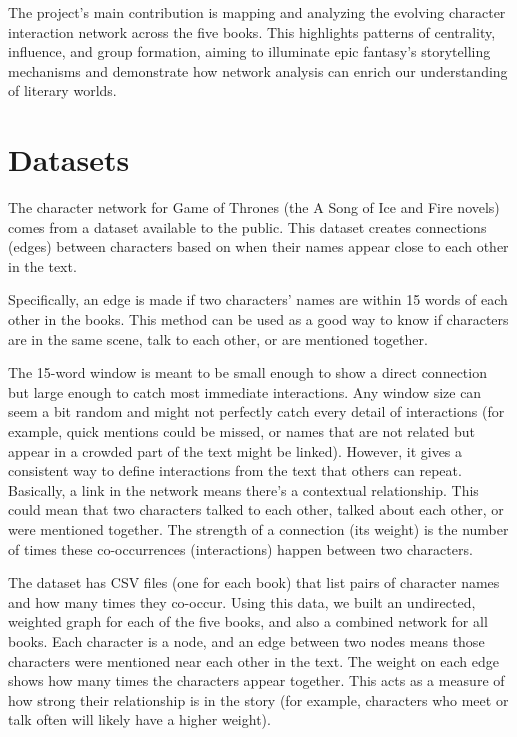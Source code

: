 \documentclass[12pt, a4paper]{article}
\begin{document}
	The project's main contribution is mapping and analyzing the evolving character interaction network across the five books. This highlights patterns of centrality, influence, and group formation, aiming to illuminate epic fantasy's storytelling mechanisms and demonstrate how network analysis can enrich our understanding of literary worlds.
	\section{Datasets}
	\label{datasets}
	
	The character network for Game of Thrones (the A Song of Ice and Fire novels) comes from a dataset available to the public. 
	This dataset creates connections (edges) between characters based on when their names appear close to each other in the text. 
	
	Specifically, an edge is made if two characters' names are within 15 words of each other in the books. 
	This method can be used as a good way to know if characters are in the same scene, talk to each other, or are mentioned together. 
	
	The 15-word window is meant to be small enough to show a direct connection but large enough to catch most immediate interactions. Any window size can seem a bit random and might not perfectly catch every detail of interactions (for example, quick mentions could be missed, or names that are not related but appear in a crowded part of the text might be linked). However, it gives a consistent way to define interactions from the text that others can repeat. Basically, a link in the network means there's a contextual relationship. This could mean that two characters talked to each other, talked about each other, or were mentioned together. The strength of a connection (its weight) is the number of times these co-occurrences (interactions) happen between two characters. 
	
	The dataset has CSV files (one for each book) that list pairs of character names and how many times they co-occur. Using this data, we built an undirected, weighted graph for each of the five books, and also a combined network for all books. Each character is a node, and an edge between two nodes means those characters were mentioned near each other in the text. The weight on each edge shows how many times the characters appear together. This acts as a measure of how strong their relationship is in the story (for example, characters who meet or talk often will likely have a higher weight).
	
\end{document}
